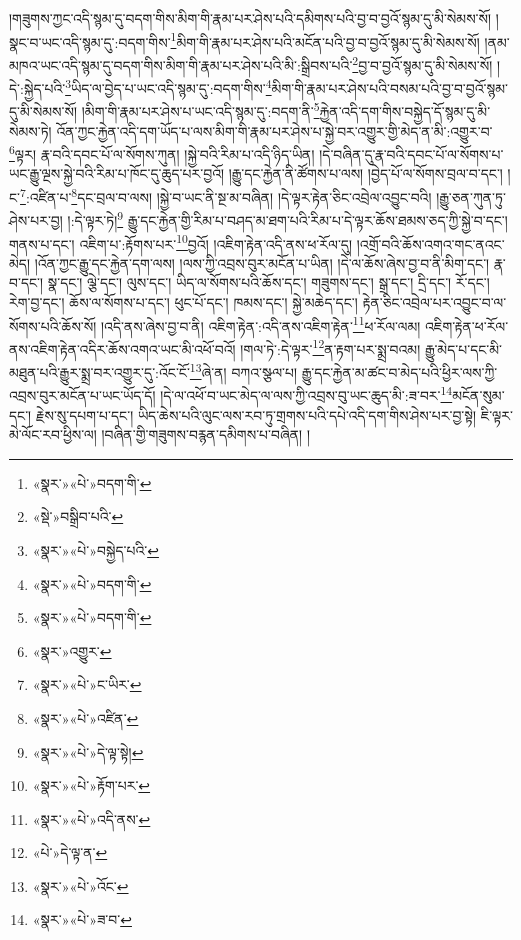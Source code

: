 །གཟུགས་ཀྱང་འདི་སྙམ་དུ་བདག་གིས་མིག་གི་རྣམ་པར་ཤེས་པའི་དམིགས་པའི་བྱ་བ་བྱའོ་སྙམ་དུ་མི་སེམས་སོ། །སྣང་བ་ཡང་འདི་སྙམ་དུ་:བདག་གིས་\footnote{«སྣར་»«པེ་»བདག་གི་}མིག་གི་རྣམ་པར་ཤེས་པའི་མངོན་པའི་བྱ་བ་བྱའོ་སྙམ་དུ་མི་སེམས་སོ། །ནམ་མཁའ་ཡང་འདི་སྙམ་དུ་བདག་གིས་མིག་གི་རྣམ་པར་ཤེས་པའི་མི་:སྒྲིབས་པའི་\footnote{«སྡེ་»བསྒྲིབ་པའི་}བྱ་བ་བྱའོ་སྙམ་དུ་མི་སེམས་སོ། །དེ་:སྐྱེད་པའི་\footnote{«སྣར་»«པེ་»བསྐྱེད་པའི་}ཡིད་ལ་བྱེད་པ་ཡང་འདི་སྙམ་དུ་:བདག་གིས་\footnote{«སྣར་»«པེ་»བདག་གི་}མིག་གི་རྣམ་པར་ཤེས་པའི་བསམ་པའི་བྱ་བ་བྱའོ་སྙམ་དུ་མི་སེམས་སོ། །མིག་གི་རྣམ་པར་ཤེས་པ་ཡང་འདི་སྙམ་དུ་:བདག་ནི་\footnote{«སྣར་»«པེ་»བདག་གི་}རྐྱེན་འདི་དག་གིས་བསྐྱེད་དོ་སྙམ་དུ་མི་སེམས་ཏེ། འོན་ཀྱང་རྐྱེན་འདི་དག་ཡོད་པ་ལས་མིག་གི་རྣམ་པར་ཤེས་པ་སྐྱེ་བར་འགྱུར་གྱི་མེད་ན་མི་:འགྱུར་བ་\footnote{«སྣར་»འགྱུར་}ལྟར། རྣ་བའི་དབང་པོ་ལ་སོགས་ཀུན། །སྐྱེ་བའི་རིམ་པ་འདི་ཉིད་ཡིན། །དེ་བཞིན་དུ་རྣ་བའི་དབང་པོ་ལ་སོགས་པ་ཡང་རྒྱུ་ལྔས་སྐྱེ་བའི་རིམ་པ་ཁོང་དུ་ཆུད་པར་བྱའོ། །རྒྱུ་དང་རྐྱེན་ནི་ཚོགས་པ་ལས། །བྱེད་པོ་ལ་སོགས་བྲལ་བ་དང་། །ང་\footnote{«སྣར་»«པེ་»ང་ཡིར་}:འཛིན་པ་\footnote{«སྣར་»«པེ་»འཛིན་}དང་བྲལ་བ་ལས། །སྐྱེ་བ་ཡང་ནི་སྔ་མ་བཞིན། །དེ་ལྟར་རྟེན་ཅིང་འབྲེལ་འབྱུང་བའི། །རྒྱུ་ཅན་ཀུན་ཏུ་ཤེས་པར་བྱ། །:དེ་ལྟར་ཏེ།\footnote{«སྣར་»«པེ་»དེ་ལྟ་སྟེ།} རྒྱུ་དང་རྐྱེན་གྱི་རིམ་པ་བཤད་མ་ཐག་པའི་རིམ་པ་དེ་ལྟར་ཆོས་ཐམས་ཅད་ཀྱི་སྐྱེ་བ་དང་། གནས་པ་དང་། འཇིག་པ་:རྟོགས་པར་\footnote{«སྣར་»«པེ་»རྟོག་པར་}བྱའོ། །འཇིག་རྟེན་འདི་ནས་ཕ་རོལ་དུ། །འགྲོ་བའི་ཆོས་འགའ་གང་ནའང་མེད། །འོན་ཀྱང་རྒྱུ་དང་རྐྱེན་དག་ལས། །ལས་ཀྱི་འབྲས་བུར་མངོན་པ་ཡིན། །དེ་ལ་ཆོས་ཞེས་བྱ་བ་ནི་མིག་དང་། རྣ་བ་དང་། སྣ་དང་། ལྕེ་དང་། ལུས་དང་། ཡིད་ལ་སོགས་པའི་ཆོས་དང་། གཟུགས་དང་། སྒྲ་དང་། དྲི་དང་། རོ་དང་། རེག་བྱ་དང་། ཆོས་ལ་སོགས་པ་དང་། ཕུང་པོ་དང་། ཁམས་དང་། སྐྱེ་མཆེད་དང་། རྟེན་ཅིང་འབྲེལ་པར་འབྱུང་བ་ལ་སོགས་པའི་ཆོས་སོ། །འདི་ནས་ཞེས་བྱ་བ་ནི། འཇིག་རྟེན་:འདི་ནས་འཇིག་རྟེན་\footnote{«སྣར་»«པེ་»འདི་ནས་}ཕ་རོལ་ལམ། འཇིག་རྟེན་ཕ་རོལ་ནས་འཇིག་རྟེན་འདིར་ཆོས་འགའ་ཡང་མི་འཕོ་བའོ། །གལ་ཏེ་:དེ་ལྟར་\footnote{«པེ་»དེ་ལྟ་ན་}ན་རྟག་པར་སྨྲ་བའམ། རྒྱུ་མེད་པ་དང་མི་མཐུན་པའི་རྒྱུར་སྨྲ་བར་འགྱུར་དུ་:འོང་ངོ་\footnote{«སྣར་»«པེ་»འོང་}ཞེ་ན། བཀའ་སྩལ་པ། རྒྱུ་དང་རྐྱེན་མ་ཚང་བ་མེད་པའི་ཕྱིར་ལས་ཀྱི་འབྲས་བུར་མངོན་པ་ཡང་ཡོད་དོ། །དེ་ལ་འཕོ་བ་ཡང་མེད་ལ་ལས་ཀྱི་འབྲས་བུ་ཡང་ཆུད་མི་:ཟ་བར་\footnote{«སྣར་»«པེ་»ཟ་བ་}མངོན་སུམ་དང་། རྗེས་སུ་དཔག་པ་དང་། ཡིད་ཆེས་པའི་ལུང་ལས་རབ་ཏུ་གྲགས་པའི་དཔེ་འདི་དག་གིས་ཤེས་པར་བྱ་སྟེ། ཇི་ལྟར་མེ་ལོང་རབ་ཕྱིས་ལ། །བཞིན་གྱི་གཟུགས་བརྙན་དམིགས་པ་བཞིན། །
